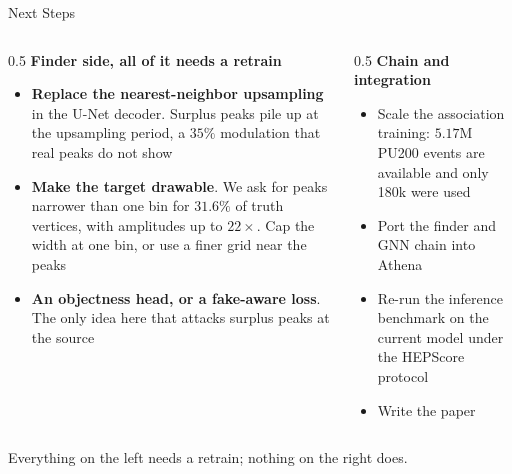 \documentclass[xcolor=table,aspectratio=169]{beamer}
\begin{document}
\begin{frame}{Next Steps}
    \begin{columns}[t]
        \begin{column}{0.5\linewidth}
            \textbf{Finder side, all of it needs a retrain}
            \begin{itemize}
                \setlength\itemsep{0.4em}
                \item \small \textbf{Replace the nearest-neighbor upsampling} in the
                    U-Net decoder. Surplus peaks pile up at the upsampling period, a
                    $35\%$ modulation that real peaks do not show
                \item \small \textbf{Make the target drawable}. We ask for peaks
                    narrower than one bin for $31.6\%$ of truth vertices, with
                    amplitudes up to $22\times$. Cap the width at one bin, or use a
                    finer grid near the peaks
                \item \small \textbf{An objectness head, or a fake-aware loss}. The
                    only idea here that attacks surplus peaks at the source
            \end{itemize}
        \end{column}
        \begin{column}{0.5\linewidth}
            \textbf{Chain and integration}
            \begin{itemize}
                \setlength\itemsep{0.5em}
                \item \small Scale the association training: $5.17$M PU200 events are
                    available and only 180k were used
                \item \small Port the finder and GNN chain into Athena
                \item \small Re-run the inference benchmark on the current model under
                    the HEPScore protocol
                \item \small Write the paper
            \end{itemize}
        \end{column}
    \end{columns}
    \vspace{0.5em}
    \centering
    {\small\textcolor{black!60}{Everything on the left needs a retrain; nothing on the
    right does.}}
\end{frame}

\end{document}
